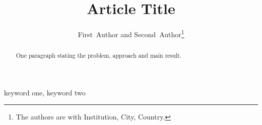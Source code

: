 \documentclass[journal]{IEEEtran}
\begin{document}
\title{Article Title}
\author{First~Author and Second~Author\thanks{The authors are with Institution, City, Country.}}
\maketitle
\begin{abstract}
One paragraph stating the problem, approach and main result.
\end{abstract}
\begin{IEEEkeywords}
keyword one, keyword two
\end{IEEEkeywords}




\end{document}
